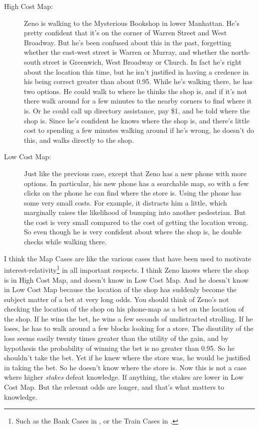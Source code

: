 \begin{description}
\item[High Cost Map:] Zeno is walking to the Mysterious Bookshop in lower Manhattan. He's pretty confident that it's on the corner of Warren Street and West Broadway. But he's been confused about this in the past, forgetting whether the east-west street is Warren or Murray, and whether the north-south street is Greenwich, West Broadway or Church. In fact he's right about the location this time, but he isn't justified in having a credence in his being correct greater than about 0.95. While he's walking there, he has two options. He could walk to where he thinks the shop is, and if it's not there walk around for a few minutes to the nearby corners to find where it is. Or he could call up directory assistance, pay \$1, and be told where the shop is. Since he's confident he knows where the shop is, and there's little cost to spending a few minutes walking around if he's wrong, he doesn't do this, and walks directly to the shop.
\item[Low Cost Map:] Just like the previous case, except that Zeno has a new phone with more options. In particular, his new phone has a searchable map, so with a few clicks on the phone he can find where the store is. Using the phone has some very small costs. For example, it distracts him a little, which marginally raises the likelihood of bumping into another pedestrian. But the cost is very small compared to the cost of getting the location wrong. So even though he is very confident about where the shop is, he double checks while walking there.
\end{description}

\noindent I think the Map Cases are like the various cases that have been used to motivate interest-relativity\footnote{Such as the Bank Cases in \citet{Stanley2005-STAKAP}, or the Train Cases in \citet{Fantl2002}.} in all important respects. I think Zeno knows where the shop is in High Cost Map, and doesn't know in Low Cost Map. And he doesn't know in Low Cost Map because the location of the shop has suddenly become the subject matter of a bet at very long odds. You should think of Zeno's not checking the location of the shop on his phone-map as a bet on the location of the shop. If he wins the bet, he wins a few seconds of undistracted strolling. If he loses, he has to walk around a few blocks looking for a store. The disutility of the loss seems easily twenty times greater than the utility of the gain, and by hypothesis the probability of winning the bet is no greater than 0.95. So he shouldn't take the bet. Yet  if he knew where the store was, he would be justified in taking the bet. So he doesn't know where the store is. Now this is not a case where higher \textit{stakes} defeat knowledge. If anything, the stakes are lower in Low Cost Map. But the relevant odds are longer, and that's what matters to knowledge.

